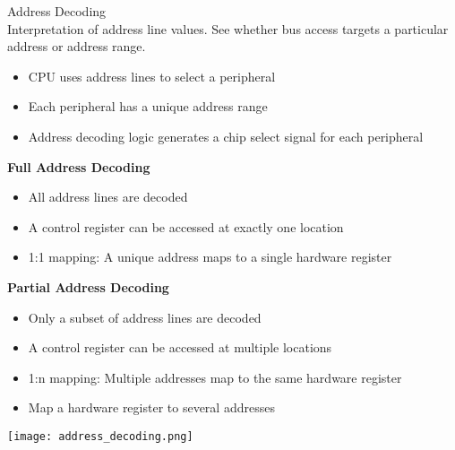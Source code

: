 \begin{definition}{Address Decoding}\\
    Interpretation of address line values. See whether bus access targets a particular address or address range.
    \begin{itemize}
        \item CPU uses address lines to select a peripheral
        \item Each peripheral has a unique address range
        \item Address decoding logic generates a chip select signal for each peripheral
    \end{itemize}

    \textbf{Full Address Decoding}
    \begin{itemize}
        \item All address lines are decoded
        \item A control register can be accessed at exactly one location
        \item 1:1 mapping: A unique address maps to a single hardware register
    \end{itemize}

    \textbf{Partial Address Decoding}
    \begin{itemize}
        \item Only a subset of address lines are decoded
        \item A control register can be accessed at multiple locations
        \item 1:n mapping: Multiple addresses map to the same hardware register
        \item Map a hardware register to several addresses
    \end{itemize}
    \texttt{[image: address\_decoding.png]}
\end{definition}